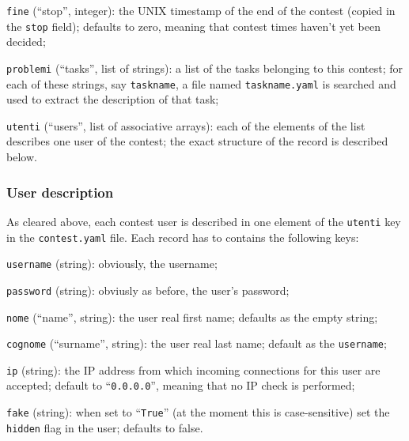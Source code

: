 \documentclass[a4paper,8pt]{amsart}
\newenvironment{squishlist}{%
  \begin{list}{\textbullet}%
    { \setlength{\itemsep}{0pt}%
      \setlength{\parsep}{3pt}%
      \setlength{\topsep}{3pt}%
      \setlength{\partopsep}{0pt}%
      \setlength{\leftmargin}{1.5em}%
      \setlength{\labelwidth}{1em}%
      \setlength{\labelsep}{0.5em} }%
}{\end{list}}
\newcommand{\id}[1]{\texttt{#1}}
\newcommand{\file}[1]{\texttt{#1}}
\begin{document}
\begin{multicols}{2}
\begin{squishlist}
  \item \id{fine} (``stop'', integer): the UNIX timestamp of the end
    of the contest (copied in the \id{stop} field); defaults to zero,
    meaning that contest times haven't yet been decided;

  \item \id{problemi} (``tasks'', list of strings): a list of the
    tasks belonging to this contest; for each of these strings, say
    \id{taskname}, a file named \file{taskname.yaml} is searched and
    used to extract the description of that task;

  \item \id{utenti} (``users'', list of associative arrays): each of
    the elements of the list describes one user of the contest; the
    exact structure of the record is described below.

  \end{squishlist}

  \subsubsection{User description}

  As cleared above, each contest user is described in one element of
  the \id{utenti} key in the \file{contest.yaml} file. Each record has
  to contains the following keys:

  \begin{squishlist}

  \item \id{username} (string): obviously, the username;

  \item \id{password} (string): obviusly as before, the user's
    password;

  \item \id{nome} (``name'', string): the user real first name;
    defaults as the empty string;

  \item \id{cognome} (``surname'', string): the user real last name;
    default as the \id{username};

  \item \id{ip} (string): the IP address from which incoming
    connections for this user are accepted; default to
    ``\id{0.0.0.0}'', meaning that no IP check is performed;

  \item \id{fake} (string): when set to ``\id{True}'' (at the moment
    this is case-sensitive) set the \id{hidden} flag in the
    user; defaults to false.


\end{squishlist}
\end{multicols}
\end{document}

